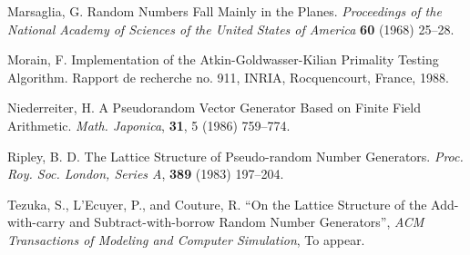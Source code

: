 \begin {refer}
 Marsaglia, G. Random Numbers Fall Mainly in the Planes.
{\it Proceedings of the National Academy of Sciences of the United States of
America\/} {\bf 60} (1968) 25--28.

 Morain, F. Implementation of the Atkin-Gold\-was\-ser-Kilian
Primality Testing Algorithm. Rapport de recherche no. 911, INRIA, Rocquencourt,
France, 1988.

 Niederreiter, H.
A Pseudorandom Vector Generator Based on Finite Field Arithmetic.
{\it Math. Japonica\/}, {\bf 31}, 5 (1986) 759--774.

 Ripley, B. D. The Lattice Structure of Pseudo-random Number
Generators.  {\em Proc. Roy. Soc. London, Series A}, {\bf 389} (1983) 197--204.

 Tezuka, S., L'Ecuyer, P., and Couture, R.
``On the Lattice Structure of the Add-with-carry and Subtract-with-borrow
Random Number Generators'',
{\em ACM Transactions of Modeling and Computer Simulation\/},
To appear.

\end {refer}
\fi  %
